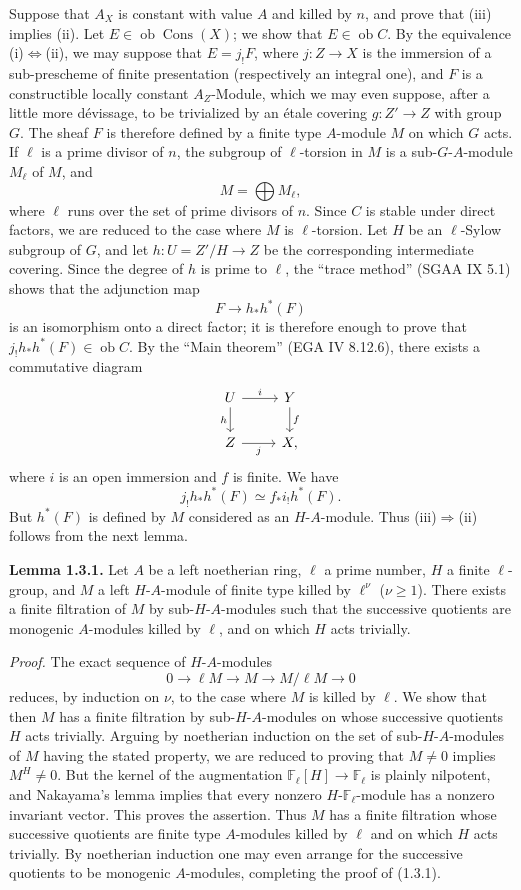 \documentclass[11pt]{article}
\providecommand{\Cons}{\operatorname{Cons}}
\newcommand{\F}{\mathbb{F}}
\newcommand{\ob}{\operatorname{ob}}
\providecommand{\ob}{\operatorname{ob}}
\begin{document}
Suppose that $A_X$ is constant with value $A$ and killed by $n$, and prove that (iii) implies (ii). Let $E\in\ob\Cons(X)$; we show that $E\in\ob C$. By the equivalence (i)$\Leftrightarrow$(ii), we may suppose that $E=j_!F$, where $j:Z\to X$ is the immersion of a sub-prescheme of finite presentation (respectively an integral one), and $F$ is a constructible locally constant $A_Z$-Module, which we may even suppose, after a little more dévissage, to be trivialized by an étale covering $g:Z'\to Z$ with group $G$. The sheaf $F$ is therefore defined by a finite type $A$-module $M$ on which $G$ acts. If $\ell$ is a prime divisor of $n$, the subgroup of $\ell$-torsion in $M$ is a sub-$G$-$A$-module $M_\ell$ of $M$, and
\[
        M=\bigoplus M_\ell,
\]
where $\ell$ runs over the set of prime divisors of $n$. Since $C$ is stable under direct factors, we are reduced to the case where $M$ is $\ell$-torsion. Let $H$ be an $\ell$-Sylow subgroup of $G$, and let $h:U=Z'/H\to Z$ be the corresponding intermediate covering. Since the degree of $h$ is prime to $\ell$, the ``trace method'' (SGAA IX 5.1) shows that the adjunction map
\[
        F\longrightarrow h_*h^*(F)
\]
is an isomorphism onto a direct factor; it is therefore enough to prove that $j_!h_*h^*(F)\in\ob C$. By the ``Main theorem'' (EGA IV 8.12.6), there exists a commutative diagram
\[
\begin{tikzcd}
U \arrow[r,"i"] \arrow[d,"h"'] & Y \arrow[d,"f"]\\
Z \arrow[r,"j"'] & X,
\end{tikzcd}
\]
where $i$ is an open immersion and $f$ is finite. We have
\[
        j_!h_*h^*(F) \simeq f_* i_! h^*(F).
\]
But $h^*(F)$ is defined by $M$ considered as an $H$-$A$-module. Thus (iii)$\Rightarrow$(ii) follows from the next lemma.

\textbf{Lemma 1.3.1.} Let $A$ be a left noetherian ring, $\ell$ a prime number, $H$ a finite $\ell$-group, and $M$ a left $H$-$A$-module of finite type killed by $\ell^\nu$ ($\nu\geq1$). There exists a finite filtration of $M$ by sub-$H$-$A$-modules such that the successive quotients are monogenic $A$-modules killed by $\ell$, and on which $H$ acts trivially.

\emph{Proof.} The exact sequence of $H$-$A$-modules
\[
        0\longrightarrow \ell M\longrightarrow M\longrightarrow M/\ell M\longrightarrow 0
\]
reduces, by induction on $\nu$, to the case where $M$ is killed by $\ell$. We show that then $M$ has a finite filtration by sub-$H$-$A$-modules on whose successive quotients $H$ acts trivially. Arguing by noetherian induction on the set of sub-$H$-$A$-modules of $M$ having the stated property, we are reduced to proving that $M\neq0$ implies $M^H\neq0$. But the kernel of the augmentation $\F_\ell[H]\to\F_\ell$ is plainly nilpotent, and Nakayama's lemma implies that every nonzero $H$-$\F_\ell$-module has a nonzero invariant vector. This proves the assertion. Thus $M$ has a finite filtration whose successive quotients are finite type $A$-modules killed by $\ell$ and on which $H$ acts trivially. By noetherian induction one may even arrange for the successive quotients to be monogenic $A$-modules, completing the proof of (1.3.1).
\end{document}
